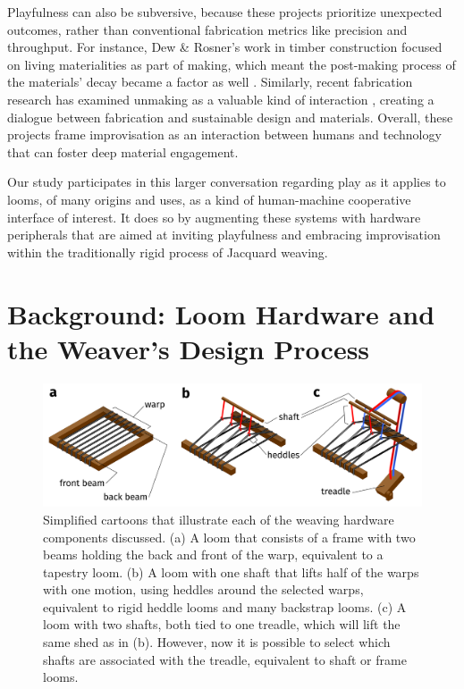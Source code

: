 Playfulness can also be subversive, because these projects prioritize unexpected outcomes, rather than conventional fabrication metrics like precision and throughput. For instance, Dew \& Rosner's work in timber construction focused on living materialities as part of making, which meant the post-making process of the materials' decay became a factor as well \cite{dew_lessons_2018}. Similarly, recent fabrication research has examined unmaking as a valuable kind of interaction \cite{song_unmaking_2021}, creating a dialogue between fabrication and sustainable design and materials. Overall, these projects frame improvisation as an interaction between humans and technology that can foster deep material engagement. 

Our study participates in this larger conversation regarding play as it applies to looms, of many origins and uses, as a kind of human-machine cooperative interface of interest. It does so by augmenting these systems with hardware peripherals that are aimed at inviting playfulness and embracing improvisation within the traditionally rigid process of Jacquard weaving.

\section{Background: Loom Hardware and the Weaver's Design Process}
\label{sect_bg-looms}

\begin{figure}[h]
  \centering
  \includegraphics[width=\linewidth]{figs/LP_2_loom-parts.png}
  \caption[Illustrations of different hardware components of weaving looms.]{Simplified cartoons that illustrate each of the weaving hardware components discussed. (a) A loom that consists of a frame with two beams holding the back and front of the warp, equivalent to a tapestry loom. (b) A loom with one shaft that lifts half of the warps with one motion, using heddles around the selected warps, equivalent to rigid heddle looms and many backstrap looms. (c) A loom with two shafts, both tied to one treadle, which will lift the same shed as in (b). However, now it is possible to select which shafts are associated with the treadle, equivalent to shaft or frame looms.}
  \label{fig:loom-parts}
\end{figure}

